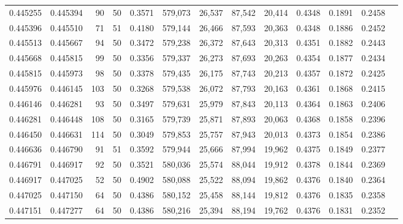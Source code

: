 \begin{tabular}{rrrrrrrrrrrrr}
0.445255 & 0.445394 &    90 &  50 &                                     0.3571 & 579,073 &  26,537 &  87,542 &  20,414 & 0.4348 & 0.1891 & 0.2458 \\
0.445396 & 0.445510 &    71 &  51 &                                     0.4180 & 579,144 &  26,466 &  87,593 &  20,363 & 0.4348 & 0.1886 & 0.2452 \\
0.445513 & 0.445667 &    94 &  50 &                                     0.3472 & 579,238 &  26,372 &  87,643 &  20,313 & 0.4351 & 0.1882 & 0.2443 \\
0.445668 & 0.445815 &    99 &  50 &                                     0.3356 & 579,337 &  26,273 &  87,693 &  20,263 & 0.4354 & 0.1877 & 0.2434 \\
0.445815 & 0.445973 &    98 &  50 &                                     0.3378 & 579,435 &  26,175 &  87,743 &  20,213 & 0.4357 & 0.1872 & 0.2425 \\
0.445976 & 0.446145 &   103 &  50 &                                     0.3268 & 579,538 &  26,072 &  87,793 &  20,163 & 0.4361 & 0.1868 & 0.2415 \\
0.446146 & 0.446281 &    93 &  50 &                                     0.3497 & 579,631 &  25,979 &  87,843 &  20,113 & 0.4364 & 0.1863 & 0.2406 \\
0.446281 & 0.446448 &   108 &  50 &                                     0.3165 & 579,739 &  25,871 &  87,893 &  20,063 & 0.4368 & 0.1858 & 0.2396 \\
0.446450 & 0.446631 &   114 &  50 &                                     0.3049 & 579,853 &  25,757 &  87,943 &  20,013 & 0.4373 & 0.1854 & 0.2386 \\
0.446636 & 0.446790 &    91 &  51 &                                     0.3592 & 579,944 &  25,666 &  87,994 &  19,962 & 0.4375 & 0.1849 & 0.2377 \\
0.446791 & 0.446917 &    92 &  50 &                                     0.3521 & 580,036 &  25,574 &  88,044 &  19,912 & 0.4378 & 0.1844 & 0.2369 \\
0.446917 & 0.447025 &    52 &  50 &                                     0.4902 & 580,088 &  25,522 &  88,094 &  19,862 & 0.4376 & 0.1840 & 0.2364 \\
0.447025 & 0.447150 &    64 &  50 &                                     0.4386 & 580,152 &  25,458 &  88,144 &  19,812 & 0.4376 & 0.1835 & 0.2358 \\
0.447151 & 0.447277 &    64 &  50 &                                     0.4386 & 580,216 &  25,394 &  88,194 &  19,762 & 0.4376 & 0.1831 & 0.2352 \\

\end{tabular}
